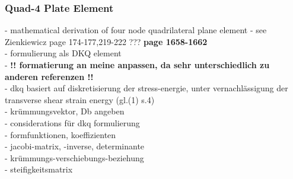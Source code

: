 \documentclass[11pt,twoside]{scrartcl}
\begin{document}
  \subsubsection{Quad-4 Plate Element}
  - mathematical derivation of four node quadrilateral plane element\newline
  - see Zienkiewicz \cite{zienkiewicz2000finite} page 174-177,219-222  \cite{zienkiewicz1977fem} ???  \textbf{\cite{batoz1982evaluation} page 1658-1662}\\
  - formulierung als DKQ element\\
  - \textbf{!! formatierung an meine anpassen, da sehr unterschiedlich zu anderen referenzen !!}\\
  - dkq basiert auf diskretisierung der stress-energie, unter vernachlässigung der transverse shear strain energy (gl.(1) s.4)\\
  - krümmungsvektor, Db angeben\\
  - considerations für dkq formulierung\\
  - formfunktionen, koeffizienten\\
  - jacobi-matrix, -inverse, determinante\\
  - krümmungs-verschiebungs-beziehung\\
  - steifigkeitsmatrix
\end{document}
